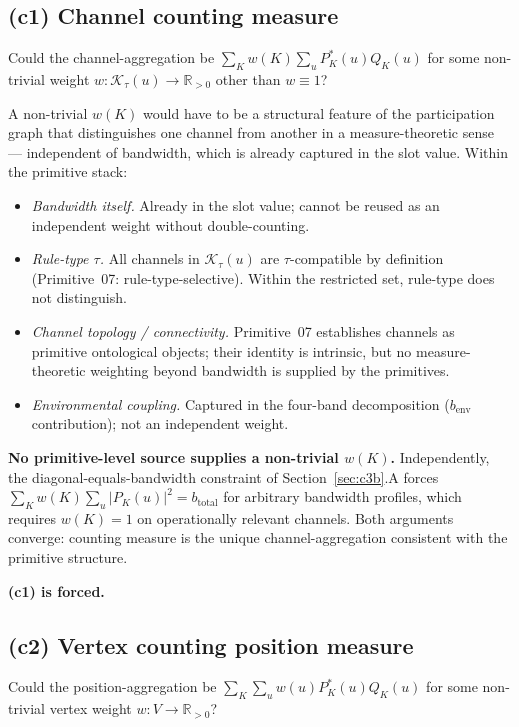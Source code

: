\documentclass[11pt,a4paper]{article}
\begin{document}
\subsection{(c1) Channel counting measure}

Could the channel-aggregation be $\sum_K w(K) \sum_u P_K^*(u) Q_K(u)$ for some non-trivial weight $w : \mathcal{K}_\tau(u) \to \mathbb{R}_{>0}$ other than $w \equiv 1$?

A non-trivial $w(K)$ would have to be a structural feature of the participation graph that distinguishes one channel from another in a measure-theoretic sense --- independent of bandwidth, which is already captured in the slot value. Within the primitive stack:

\begin{itemize}
  \item \emph{Bandwidth itself.} Already in the slot value; cannot be reused as an independent weight without double-counting.
  \item \emph{Rule-type $\tau$.} All channels in $\mathcal{K}_\tau(u)$ are $\tau$-compatible by definition (Primitive~07: rule-type-selective). Within the restricted set, rule-type does not distinguish.
  \item \emph{Channel topology / connectivity.} Primitive~07 establishes channels as primitive ontological objects; their identity is intrinsic, but no measure-theoretic weighting beyond bandwidth is supplied by the primitives.
  \item \emph{Environmental coupling.} Captured in the four-band decomposition ($b_\mathrm{env}$ contribution); not an independent weight.
\end{itemize}

\textbf{No primitive-level source supplies a non-trivial $w(K)$.} Independently, the diagonal-equals-bandwidth constraint of Section~\ref{sec:c3b}.A forces $\sum_K w(K) \sum_u |P_K(u)|^2 = b_\mathrm{total}$ for arbitrary bandwidth profiles, which requires $w(K) = 1$ on operationally relevant channels. Both arguments converge: counting measure is the unique channel-aggregation consistent with the primitive structure.

\textbf{(c1) is forced.}

\subsection{(c2) Vertex counting position measure}

Could the position-aggregation be $\sum_K \sum_u w(u) P_K^*(u) Q_K(u)$ for some non-trivial vertex weight $w : V \to \mathbb{R}_{>0}$?
\end{document}
